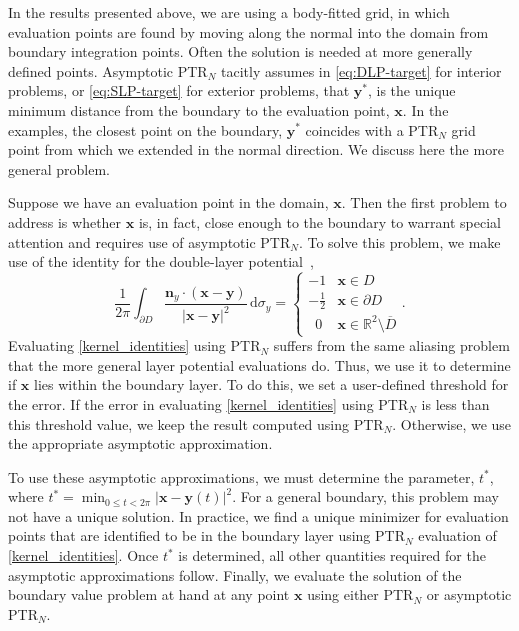 \documentclass{article}[12pt]
\numberwithin{equation}{section}
\begin{document}
In the results presented above, we are using a body-fitted grid, in
which evaluation points are found by moving along the
  normal into the domain from boundary integration points.  Often the
solution is needed at more generally defined points.  Asymptotic
PTR$_{N}$ tacitly assumes in \eqref{eq:DLP-target}
for interior problems, or \eqref{eq:SLP-target} for exterior problems,
that $\mathbf{y}^{\ast}$, is the unique minimum distance from the
boundary to the evaluation point, $\mathbf{x}$.  In the examples, the
closest point on the boundary, $\mathbf{y}^{\ast}$ coincides with a
PTR$_{N}$ grid point from which we extended in the
normal direction.  We discuss here the more general problem.

Suppose we have an evaluation point in the domain, $\mathbf{x}$.  Then
the first problem to address is whether $\mathbf{x}$ is, in fact,
close enough to the boundary to warrant special attention and requires
use of asymptotic PTR$_{N}$. To solve this problem,
we make use of the identity for the double-layer
potential~\cite{kress1999linear},
\begin{equation}
  \frac{1}{2\pi}\int_{\partial D} \frac{\mathbf{n}_y \cdot (\mathbf{x}
    - \mathbf{y})}{|\mathbf{x} - \mathbf{y}|^2} \, \mathrm{d} \sigma_y
  = \begin{cases} 
    -1 & \mathbf{x} \in D\\
    -\frac{1}{2} & \mathbf{x} \in \partial D\\
    \,\,\, 0 & \mathbf{x} \in \mathbb{R}^2 \setminus \overline{D} 
  \end{cases}.
  \label{kernel_identities}
\end{equation}
Evaluating \eqref{kernel_identities} using PTR$_{N}$
suffers from the same aliasing problem that the more general layer
potential evaluations do. Thus, we use it to determine if $\mathbf{x}$
lies within the boundary layer. To do this, we set a user-defined
threshold for the error. If the error in evaluating
\eqref{kernel_identities} using PTR$_{N}$ is less
than this threshold value, we keep the result computed using
PTR$_{N}$.  Otherwise, we use the appropriate
asymptotic approximation.

To use these asymptotic approximations, we must determine the
parameter, $t^{\ast}$, where
$t^{\ast} = \min_{0 \le t < 2 \pi} | \mathbf{x} - \mathbf{y}(t)
|^{2}$.
For a general boundary, this problem may not have a unique
solution. In practice, we find a unique minimizer for evaluation
points that are identified to be in the boundary layer using
PTR$_{N}$ evaluation of \eqref{kernel_identities}.
Once $t^{\ast}$ is determined, all other quantities required for the
asymptotic approximations follow. Finally, we evaluate the solution of
the boundary value problem at hand at any point $\mathbf{x}$ using
either  PTR$_{N}$ or asymptotic
PTR$_{N}$.
\end{document}
